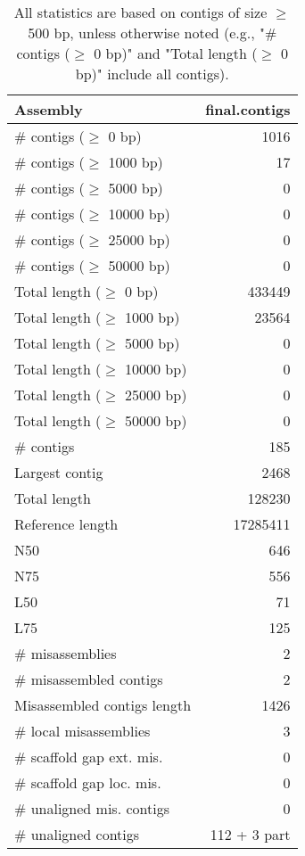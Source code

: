 \documentclass[12pt,a4paper]{article}
\begin{document}
\begin{table}[ht]
\begin{center}
\caption{All statistics are based on contigs of size $\geq$ 500 bp, unless otherwise noted (e.g., "\# contigs ($\geq$ 0 bp)" and "Total length ($\geq$ 0 bp)" include all contigs).}
\begin{tabular}{|l*{1}{|r}|}
\hline
Assembly & final.contigs \\ \hline
\# contigs ($\geq$ 0 bp) & 1016 \\ \hline
\# contigs ($\geq$ 1000 bp) & 17 \\ \hline
\# contigs ($\geq$ 5000 bp) & 0 \\ \hline
\# contigs ($\geq$ 10000 bp) & 0 \\ \hline
\# contigs ($\geq$ 25000 bp) & 0 \\ \hline
\# contigs ($\geq$ 50000 bp) & 0 \\ \hline
Total length ($\geq$ 0 bp) & 433449 \\ \hline
Total length ($\geq$ 1000 bp) & 23564 \\ \hline
Total length ($\geq$ 5000 bp) & 0 \\ \hline
Total length ($\geq$ 10000 bp) & 0 \\ \hline
Total length ($\geq$ 25000 bp) & 0 \\ \hline
Total length ($\geq$ 50000 bp) & 0 \\ \hline
\# contigs & 185 \\ \hline
Largest contig & 2468 \\ \hline
Total length & 128230 \\ \hline
Reference length & 17285411 \\ \hline
N50 & 646 \\ \hline
N75 & 556 \\ \hline
L50 & 71 \\ \hline
L75 & 125 \\ \hline
\# misassemblies & 2 \\ \hline
\# misassembled contigs & 2 \\ \hline
Misassembled contigs length & 1426 \\ \hline
\# local misassemblies & 3 \\ \hline
\# scaffold gap ext. mis. & 0 \\ \hline
\# scaffold gap loc. mis. & 0 \\ \hline
\# unaligned mis. contigs & 0 \\ \hline
\# unaligned contigs & 112 + 3 part \\ \hline

\end{tabular}
\end{center}
\end{table}
\end{document}
